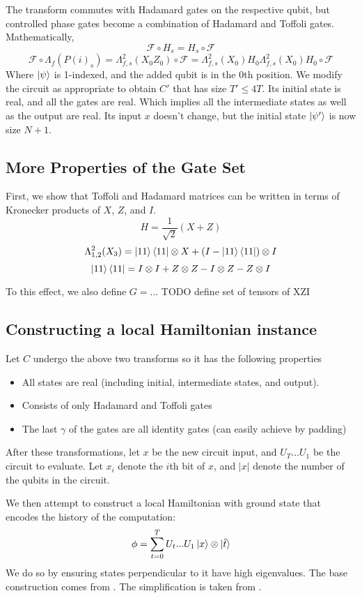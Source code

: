 The transform commutes with Hadamard gates on the respective qubit, but controlled phase gates become a combination of Hadamard and Toffoli gates. Mathematically,
$$\mathcal{F}\circ H_s=H_s\circ\mathcal{F}$$
$$\mathcal{F}\circ\Lambda_f(P(i)_s)=\Lambda^2_{f,s}(X_0Z_0)\circ\mathcal{F}=\Lambda^2_{f,s}(X_0)H_0\Lambda^2_{f,s}(X_0)H_0\circ\mathcal{F}$$
Where $\ket{\psi}$ is 1-indexed, and the added qubit is in the 0th position. We modify the circuit as appropriate to obtain $C'$ that has size $T'\leq 4T$. Its initial state is real, and all the gates are real. Which implies all the intermediate states as well as the output are real. Its input $x$ doesn't change, but the initial state $\ket{\psi'}$ is now size $N+1$.

\subsection{More Properties of the Gate Set}

First, we show that Toffoli and Hadamard matrices can be written in terms of Kronecker products of $X$, $Z$, and $I$.
$$H=\frac{1}{\sqrt{2}}(X+Z)$$
$$\Lambda^2_{1,2}(X_3)=\ket{11}\bra{11}\otimes X+(I-\ket{11}\bra{11})\otimes I$$
$$\ket{11}\bra{11}=I\otimes I+Z\otimes Z-I\otimes Z-Z\otimes I$$

To this effect, we also define $G=$... TODO define set of tensors of XZI

\subsection{Constructing a local Hamiltonian instance}

Let $C$ undergo the above two transforms so it has the following properties
\begin{itemize}
	\item All states are real (including initial, intermediate states, and output).
	\item Consists of only Hadamard and Toffoli gates
	\item The last $\gamma$ of the gates are all identity gates (can easily achieve by padding)
\end{itemize}

After these transformations, let $x$ be the new circuit input, and $U_T...U_1$ be the circuit to evaluate. Let $x_i$ denote the $i$th bit of $x$, and $|x|$ denote the number of the qubits in the circuit.

We then attempt to construct a local Hamiltonian with ground state that encodes the history of the computation: $$\phi=\sum_{t=0}^TU_t...U_1\ket{x}\otimes\ket{\hat{t}}$$
We do so by ensuring states perpendicular to it have high eigenvalues. The base construction comes from \cite{kitaev2002classical}. The simplification is taken from \cite{PhysRevA.78.012352}.

